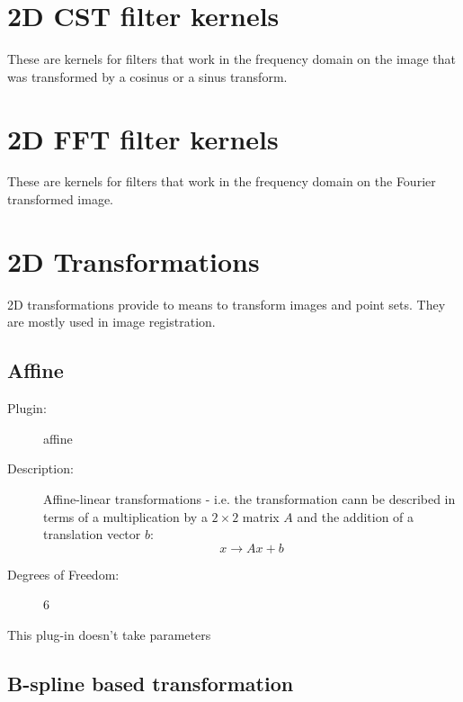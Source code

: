 \section{2D CST filter kernels}   \label {sec:cst2dkern}
   
   These are kernels for filters that work in the frequency domain on the 
   image that was transformed by a cosinus or a sinus transform. 

\section{2D FFT filter kernels}   \label {sec:fft2dkern}
   
   These are kernels for filters that work in the frequency domain on the 
   Fourier transformed image. 

\section{2D Transformations}  \label{sec:2dtransforms}
  
  2D transformations provide to means to transform images and point sets. They are mostly used 
  in image registration. 
  
  
   \subsection{Affine}
   \label{transform2d:affine}
   
   \begin{description}
   
   \item [Plugin:] affine
   \item [Description:] Affine-linear transformations - i.e. the transformation cann be described in terms of a 
   multiplication by a $2\times2$ matrix $A$ and the addition of a translation vector $b$: 
   \begin{equation}
   x \rightarrow Ax + b
   \end{equation}
   
   \item [Degrees of Freedom:] 6 
  
   \end{description}
   This plug-in doesn't take parameters 

   
   \subsection{B-spline based transformation}
   \label{transform2d:spline}
   
